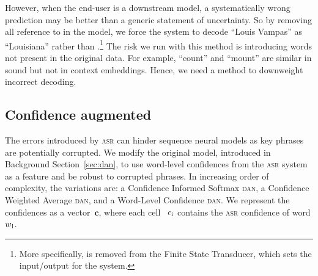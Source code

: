 However, when the end-user is a downstream model,
a systematically wrong prediction may be better than a generic
statement of uncertainty.  
%
So by removing all reference to \unk{} in
the model, we force the system to decode ``Louis Vampas'' as ``Louisiana'' rather than \unk{}.\footnote{More specifically, \unk{} is removed from the Finite State Transducer, which sets the input/output for the \asr{} system.}
%
The risk we run with this method is introducing words not present in the original
data.  For example, ``count'' and ``mount'' are similar in sound but
not in context embeddings.  Hence, we need a method to downweight
incorrect decoding.




\subsection{Confidence augmented \dan{}}
\label{sec:conf-dan}



The errors introduced by \textsc{asr} can hinder
sequence neural models as key phrases are potentially corrupted. %
%
We modify the original \dan{} model, introduced in Background Section~\ref{sec:dan}, to use word-level confidences from the \textsc{asr} system as a feature and be robust to corrupted phrases.  
%
In increasing order of complexity, the variations are: a Confidence
Informed Softmax \textsc{dan}, a Confidence Weighted Average
\textsc{dan}, and a Word-Level Confidence \textsc{dan}.
We represent the confidences as a vector~$\textbf{c}$, where each cell
~$c\textsubscript{i}$ contains the \textsc{asr} confidence of word
$w\textsubscript{i}$.


